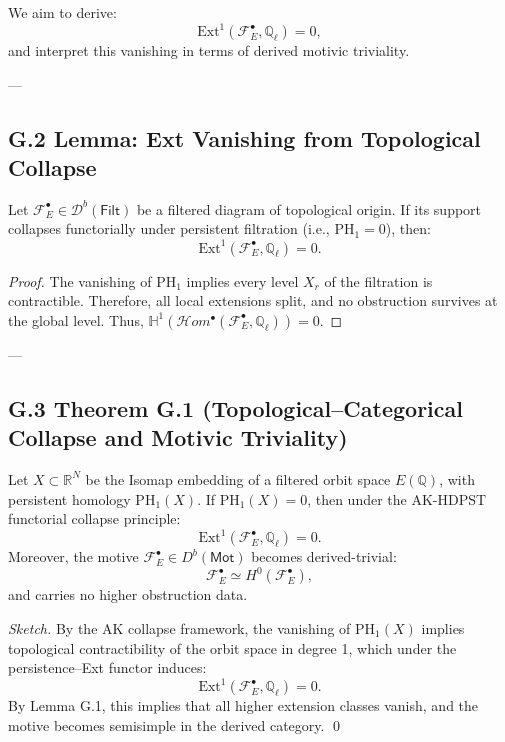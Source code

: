 We aim to derive:
\[
\mathrm{Ext}^1(\mathcal{F}_E^\bullet, \mathbb{Q}_\ell) = 0,
\]
and interpret this vanishing in terms of derived motivic triviality.

---

\subsection*{G.2 Lemma: Ext Vanishing from Topological Collapse}

\begin{lemma}
Let \( \mathcal{F}_E^\bullet \in \mathcal{D}^b(\mathsf{Filt}) \) be a filtered diagram of topological origin.  
If its support collapses functorially under persistent filtration (i.e., \( \mathrm{PH}_1 = 0 \)), then:
\[
\mathrm{Ext}^1(\mathcal{F}_E^\bullet, \mathbb{Q}_\ell) = 0.
\]
\end{lemma}

\begin{proof}
The vanishing of \( \mathrm{PH}_1 \) implies every level \( X_r \) of the filtration is contractible.  
Therefore, all local extensions split, and no obstruction survives at the global level.  
Thus, \( \mathbb{H}^1(\mathcal{H}om^\bullet(\mathcal{F}_E^\bullet, \mathbb{Q}_\ell)) = 0 \).
\end{proof}

---

\subsection*{G.3 Theorem G.1 (Topological–Categorical Collapse and Motivic Triviality)}

\begin{theorem}
Let \( X \subset \mathbb{R}^N \) be the Isomap embedding of a filtered orbit space \( E(\mathbb{Q}) \), with persistent homology \( \mathrm{PH}_1(X) \).  
If \( \mathrm{PH}_1(X) = 0 \), then under the AK-HDPST functorial collapse principle:
\[
\mathrm{Ext}^1(\mathcal{F}_E^\bullet, \mathbb{Q}_\ell) = 0.
\]
Moreover, the motive \( \mathcal{F}_E^\bullet \in D^b(\mathsf{Mot}) \) becomes derived-trivial:
\[
\mathcal{F}_E^\bullet \simeq H^0(\mathcal{F}_E^\bullet),
\]
and carries no higher obstruction data.
\end{theorem}

\begin{proof}[Sketch]
By the AK collapse framework, the vanishing of \( \mathrm{PH}_1(X) \) implies topological contractibility of the orbit space in degree 1, which under the persistence–Ext functor induces:
\[
\mathrm{Ext}^1(\mathcal{F}_E^\bullet, \mathbb{Q}_\ell) = 0.
\]
By Lemma G.1, this implies that all higher extension classes vanish, and the motive becomes semisimple in the derived category.
\qed
\end{proof}


